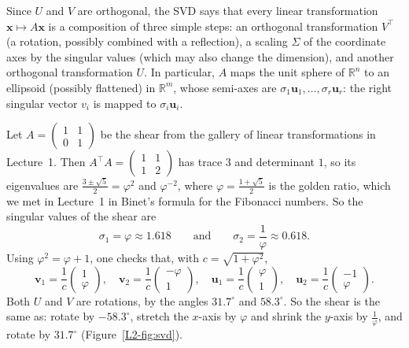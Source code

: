 Since $U$ and $V$ are orthogonal, the SVD says that every linear transformation $\mathbf{x} \mapsto A\mathbf{x}$ is a composition of three simple steps: an orthogonal transformation $V^\top$ (a rotation, possibly combined with a reflection), a scaling $\Sigma$ of the coordinate axes by the singular values (which may also change the dimension), and another orthogonal transformation $U$. In particular, $A$ maps the unit sphere of $\mathbb{R}^n$ to an ellipsoid (possibly flattened) in $\mathbb{R}^m$, whose semi-axes are $\sigma_1 \mathbf{u}_1, \ldots, \sigma_r \mathbf{u}_r$: the right singular vector $v_i$ is mapped to $\sigma_i \mathbf{u}_i$.

\begin{example}\label{L2-ex:svd-shear}
    Let $A = \begin{pmatrix} 1 & 1 \\ 0 & 1 \end{pmatrix}$ be the shear from the gallery of linear transformations in Lecture~1. Then $A^\top A = \begin{pmatrix} 1 & 1 \\ 1 & 2 \end{pmatrix}$ has trace $3$ and determinant $1$, so its eigenvalues are $\frac{3 \pm \sqrt{5}}{2} = \varphi^2$ and $\varphi^{-2}$, where $\varphi = \frac{1 + \sqrt{5}}{2}$ is the golden ratio, which we met in Lecture~1 in Binet's formula for the Fibonacci numbers. So the singular values of the shear are
    \[\sigma_1 = \varphi \approx 1.618 \qquad \text{and} \qquad \sigma_2 = \frac{1}{\varphi} \approx 0.618.\]
    Using $\varphi^2 = \varphi + 1$, one checks that, with $c = \sqrt{1 + \varphi^2}$,
    \[\mathbf{v}_1 = \frac{1}{c}\begin{pmatrix} 1 \\ \varphi \end{pmatrix}, \quad \mathbf{v}_2 = \frac{1}{c}\begin{pmatrix} -\varphi \\ 1 \end{pmatrix}, \quad \mathbf{u}_1 = \frac{1}{c}\begin{pmatrix} \varphi \\ 1 \end{pmatrix}, \quad \mathbf{u}_2 = \frac{1}{c}\begin{pmatrix} -1 \\ \varphi \end{pmatrix}.\]
    Both $U$ and $V$ are rotations, by the angles $31.7^\circ$ and $58.3^\circ$. So the shear is the same as: rotate by $-58.3^\circ$, stretch the $x$-axis by $\varphi$ and shrink the $y$-axis by $\frac{1}{\varphi}$, and rotate by $31.7^\circ$ (Figure~\ref{L2-fig:svd}).
\end{example}

